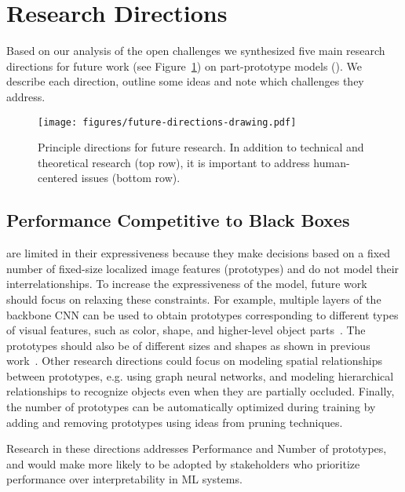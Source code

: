 \section{Research Directions}
\label{sec:directions}
Based on our analysis of the open challenges we synthesized five main research directions for future work (see Figure~\ref{fig:directions}) on part-prototype models (\ppms).
We describe each direction, outline some ideas and note which challenges they address. 

\begin{figure}
 \centering
         \vspace{1em}
        \texttt{[image: figures/future-directions-drawing.pdf]}
        \vspace{1em}
    \caption{Principle directions for future research. In addition to technical and theoretical research (top row), it is important to address human-centered issues (bottom row).}
    \label{fig:directions}
\end{figure}

\subsection{Performance Competitive to Black Boxes}
\label{ssec:directions:performance}
\ppms are limited in their expressiveness because they make decisions based on a fixed number of fixed-size localized image features (prototypes) and do not model their interrelationships. To increase the expressiveness of the model, future work should focus on relaxing these constraints. For example, multiple layers of the backbone CNN can be used to obtain prototypes corresponding to different types of visual features, such as color, shape, and higher-level object parts~\cite{Wang_2024_MCPNetInterpretableClassifier}. The prototypes should also be of different sizes and shapes as shown in previous work~\cite{Donnelly_2022_DeformableProtoPNetInterpretable}. 
Other research directions could focus on modeling spatial relationships between prototypes, e.g. using graph neural networks, and modeling hierarchical relationships to recognize objects even when they are partially occluded. Finally, the number of prototypes can be automatically optimized during training by adding and removing prototypes using ideas from pruning techniques.

Research in these directions addresses \texorpdfstring{\colorbox[RGB]{156,198,246}{Performance}}{Performance} 
and \texorpdfstring{\colorbox[RGB]{128, 223, 223}{Number}}{Number} of prototypes, %
and would make \ppms more likely to be adopted by stakeholders who prioritize performance over interpretability in ML systems. 


